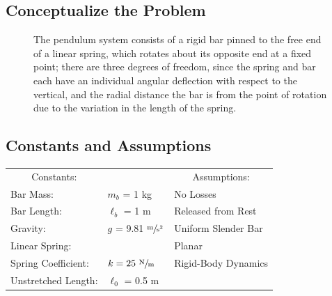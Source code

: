\documentclass[12pt]{report}
\begin{document}

{\tableofcontents\let\clearpage\relax\listoffigures}
\clearpage
{}
\newpage
\begin{flushleft}

\section{Conceptualize the Problem}
\begin{figure}[h]
  \begin{minipage}[c]{.4\textwidth}
  
\end{minipage}%
\begin{minipage}[c]{.6\textwidth}
  The pendulum system consists of a rigid bar pinned to the free end of a linear spring,
  which rotates about its opposite end at a fixed point; there are three degrees of freedom,
  since the spring and bar each have an individual angular deflection with respect to the vertical,
  and the radial distance the bar is from the point of rotation due to the variation in the
  length of the spring.
\end{minipage}
\end{figure}

\subsection{Constants and Assumptions}
\begin{tabular}{ll@{\hskip .75in}l}
 \multicolumn{1}{c}{Constants:} && \multicolumn{1}{c}{Assumptions:} \\
 Bar Mass: &$m_b$ = 1 kg & No Losses\\
 Bar Length: &$\ell_b$ = 1 m & Released from Rest\\
 Gravity: &$g$ = 9.81 $\sfrac{\text{m}}{\text{s$^2$}}$ &Uniform Slender Bar \\
 Linear Spring: &&Planar\\
 \quad Spring Coefficient:& $k = 25~\sfrac{\text{N}}{\text{m}}$ &Rigid-Body Dynamics \\
 \quad Unstretched Length:& $\ell_0$ = 0.5 m \\
\end{tabular}
\vspace{5ex}


\end{flushleft}
\end{document}
